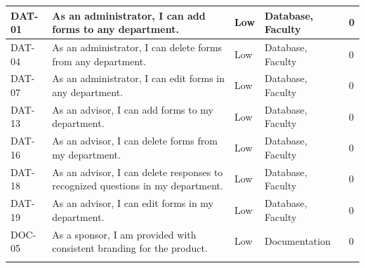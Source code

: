\documentclass[titlepage, 12pt]{article}
\begin{document}
\begin{center}
\begin{longtable}{ L{1.5cm} L{4cm} L{1.5cm} L{3cm} L{1.5cm} }
        \midrule
        DAT-01 & As an administrator, I can add forms to any department.                                                                           & Low    & Database, Faculty    & 0            \\
        \midrule
        DAT-04 & As an administrator, I can delete forms from any department.                                                                      & Low    & Database, Faculty    & 0         \\
        \midrule
        DAT-07 & As an administrator, I can edit forms in any department.                                                                          & Low    & Database, Faculty    & 0            \\
        \midrule
        DAT-13 & As an advisor, I can add forms to my department.                                                                                  & Low    & Database, Faculty    & 0           \\
        \midrule
        DAT-16 & As an advisor, I can delete forms from my department.                                                                             & Low    & Database, Faculty    & 0           \\
        \midrule
        DAT-18 & As an advisor, I can delete responses to recognized questions in my department.                                                   & Low    & Database, Faculty    & 0         \\
        \midrule
        DAT-19 & As an advisor, I can edit forms in my department.                                                                                 & Low    & Database, Faculty    & 0               \\
        \midrule
        DOC-05 & As a sponsor, I am provided with consistent branding for the product.                                                             & Low    & Documentation       & 0  \\
        \bottomrule \\

        \end{longtable}

\end{center}
\end{document}
